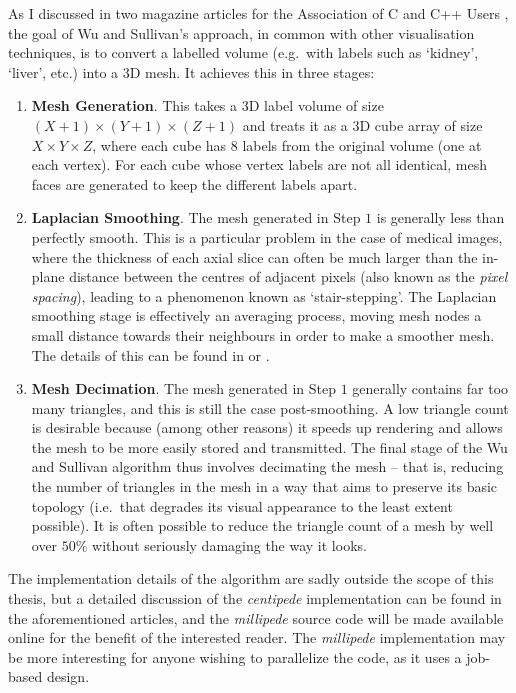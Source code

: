 As I discussed in two magazine articles for the Association of C and C++ Users \cite{golodetz08vis1,golodetz08vis2}, the goal of Wu and Sullivan's approach, in common with other visualisation techniques, is to convert a labelled volume (e.g.~with labels such as `kidney', `liver', etc.) into a 3D mesh. It achieves this in three stages:
%
\begin{enumerate}

\item \textbf{Mesh Generation}. This takes a 3D label volume of size $(X+1) \times (Y+1) \times (Z+1)$ and treats it as a 3D cube array of size $X \times Y \times Z$, where each cube has $8$ labels from the original volume (one at each vertex). For each cube whose vertex labels are not all identical, mesh faces are generated to keep the different labels apart.
\item \textbf{Laplacian Smoothing}. The mesh generated in Step $1$ is generally less than perfectly smooth. This is a particular problem in the case of medical images, where the thickness of each axial slice can often be much larger than the in-plane distance between the centres of adjacent pixels (also known as the \emph{pixel spacing}), leading to a phenomenon known as `stair-stepping'. The Laplacian smoothing stage is effectively an averaging process, moving mesh nodes a small distance towards their neighbours in order to make a smoother mesh. The details of this can be found in \cite{wu03} or \cite{golodetz08vis2}.
\item \textbf{Mesh Decimation}. The mesh generated in Step $1$ generally contains far too many triangles, and this is still the case post-smoothing. A low triangle count is desirable because (among other reasons) it speeds up rendering and allows the mesh to be more easily stored and transmitted. The final stage of the Wu and Sullivan algorithm thus involves decimating the mesh -- that is, reducing the number of triangles in the mesh in a way that aims to preserve its basic topology (i.e.~that degrades its visual appearance to the least extent possible). It is often possible to reduce the triangle count of a mesh by well over $50\%$ without seriously damaging the way it looks.

\end{enumerate}
%
The implementation details of the algorithm are sadly outside the scope of this thesis, but a detailed discussion of the \emph{centipede} implementation can be found in the aforementioned articles, and the \emph{millipede} source code will be made available online for the benefit of the interested reader. The \emph{millipede} implementation may be more interesting for anyone wishing to parallelize the code, as it uses a job-based design.

